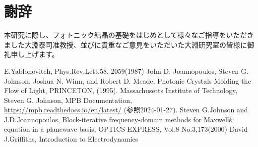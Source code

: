 \documentclass[a4paper,11pt,dvipdfmx]{jsreport}
\begin{document}
\tableofcontents






\chapter*{謝辞}
本研究に際し、フォトニック結晶の基礎をはじめとして様々なご指導をいただきました大淵泰司准教授、並びに貴重なご意見をいただいた大淵研究室の皆様に御礼申し上げます。



\begin{thebibliography}{2}
   E.Yablonovitch, Phys.Rev.Lett.58, 2059(1987)
   John D. Joannopoulos, Steven G. Johnson, Joshua N. Winn, and Robert D. Meade, Photonic Crystals Molding the Flow of Light, PRINCETON, (1995).
   Massachusetts Institute of Technology, Steven G. Johnson,  MPB Documentation,
  \\ \url{https://mpb.readthedocs.io/en/latest/}  (参照2024-01-27).
   Steven G.Johnson and J.D.Joannopoulos, Block-iterative frequency-domain methods
  for Maxwell\'s equation in a planewave basis, OPTICS EXPRESS, Vol.8 No.3,173(2000)
   David J.Griffiths, Introduction to Electrodynamics
\end{thebibliography}
\end{document}
